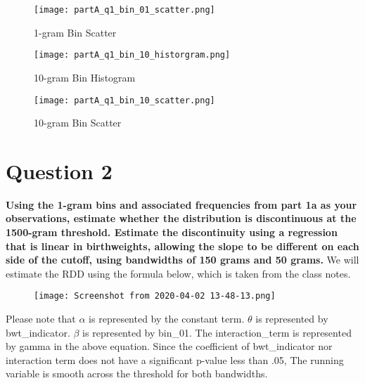 \documentclass{article}
\begin{document}
\begin{figure}[H]
\begin{center}
\texttt{[image: partA\_q1\_bin\_01\_scatter.png]}
\end{center}
\caption{1-gram Bin Scatter}
\label{fig:figure2}

\end{figure}

\begin{figure}[H]
\begin{center}
\texttt{[image: partA\_q1\_bin\_10\_historgram.png]}
\end{center}
\caption{10-gram Bin Histogram}
\label{fig:figure3}
\end{figure}

\begin{figure}[H]
\begin{center}
\texttt{[image: partA\_q1\_bin\_10\_scatter.png]}
\end{center}
\caption{10-gram Bin Scatter}
\label{fig:figure4}


\end{figure}


\section*{Question 2}
\textbf{Using the 1-gram bins and associated frequencies from part 1a as your observations, estimate whether the distribution is discontinuous at the 1500-gram threshold.  Estimate the discontinuity using a regression that is linear in birthweights, allowing the slope to be different on each side of the cutoff, using bandwidths of 150 grams and 50 grams.} We will estimate the RDD using the formula below, which is taken from the class notes.
\newline \newline 

\begin{figure}[H]
\begin{center}
\texttt{[image: Screenshot from 2020-04-02 13-48-13.png]}
\end{center}
\label{fig:figure5}
\end{figure}


Please note that $\alpha$ is represented by the constant term. $\theta$ is represented by bwt\_indicator. $\beta$ is represented by bin\_01. The interaction\_term is represented by gamma in the above equation. Since the coefficient of bwt\_indicator nor interaction term does not have a significant p-value less than .05, The running variable is smooth across the threshold for both  bandwidths.
\end{document}
